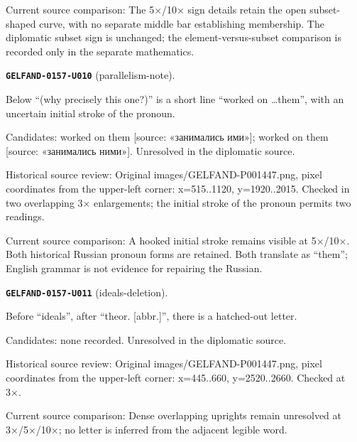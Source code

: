 Current source comparison: The 5×/10× sign details retain the open subset-shaped curve, with no separate middle bar establishing membership. The diplomatic subset sign is unchanged; the element-versus-subset comparison is recorded only in the separate mathematics.\par\medskip
\par\noindent\leavevmode{}\label{GELFAND-0157-U010}\label{GELFAND-P001447:parallelism-note}\textbf{\texttt{GELFAND-0157-U010}} (parallelism-note).\nopagebreak[4]\par
Below “(why precisely this one?)” is a short line “worked on …them”, with an uncertain initial stroke of the pronoun.\par
Candidates: worked on them [source: «занимались ими»]; worked on them [source: «занимались ними»]. Unresolved in the diplomatic source.\par
Historical source review: Original images/GELFAND-P001447.png, pixel coordinates from the upper-left corner: x=515..1120, y=1920..2015. Checked in two overlapping 3× enlargements; the initial stroke of the pronoun permits two readings.\par
Current source comparison: A hooked initial stroke remains visible at 5×/10×. Both historical Russian pronoun forms are retained. Both translate as “them”; English grammar is not evidence for repairing the Russian.\par\medskip
\par\noindent\leavevmode{}\label{GELFAND-0157-U011}\label{GELFAND-P001447:ideals-deletion}\textbf{\texttt{GELFAND-0157-U011}} (ideals-deletion).\nopagebreak[4]\par
Before “ideals”, after “theor. [abbr.]”, there is a hatched-out letter.\par
Candidates: none recorded. Unresolved in the diplomatic source.\par
Historical source review: Original images/GELFAND-P001447.png, pixel coordinates from the upper-left corner: x=445..660, y=2520..2660. Checked at 3×.\par
Current source comparison: Dense overlapping uprights remain unresolved at 3×/5×/10×; no letter is inferred from the adjacent legible word.\par\medskip

